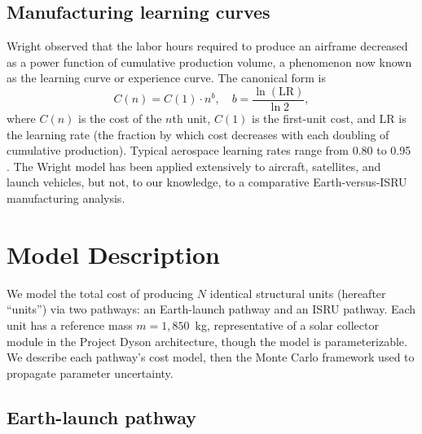 \documentclass[preprint,12pt]{elsarticle}
\begin{document}
\subsection{Manufacturing learning curves}

Wright \cite{wright1936} observed that the labor hours required to produce an airframe decreased as a power function of cumulative production volume, a phenomenon now known as the learning curve or experience curve. The canonical form is
\begin{equation}
  C(n) = C(1) \cdot n^{b}, \quad b = \frac{\ln(\text{LR})}{\ln 2},
  \label{eq:wright}
\end{equation}
where $C(n)$ is the cost of the $n$th unit, $C(1)$ is the first-unit cost, and LR is the learning rate (the fraction by which cost decreases with each doubling of cumulative production). Typical aerospace learning rates range from 0.80 to 0.95 \cite{wertz2011}. The Wright model has been applied extensively to aircraft, satellites, and launch vehicles, but not, to our knowledge, to a comparative Earth-versus-ISRU manufacturing analysis.

\section{Model Description}
\label{sec:model}

We model the total cost of producing $N$ identical structural units (hereafter ``units'') via two pathways: an Earth-launch pathway and an ISRU pathway. Each unit has a reference mass $m = 1{,}850$~kg, representative of a solar collector module in the Project Dyson architecture, though the model is parameterizable. We describe each pathway's cost model, then the Monte Carlo framework used to propagate parameter uncertainty.

\subsection{Earth-launch pathway}
\end{document}
